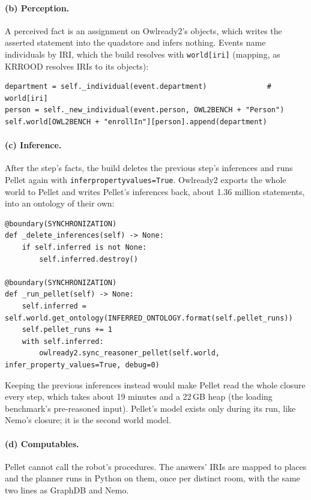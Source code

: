 \documentclass[10pt]{article}
\newcommand{\brkunderscore}{\textunderscore\allowbreak}
\newcommand{\code}[1]{{\let\_\brkunderscore\texttt{#1}}}
\begin{document}
\paragraph{(b) Perception.} A perceived fact is an assignment on Owlready2's objects, which writes the asserted
statement into the quadstore and infers nothing. Events name individuals by IRI, which the build resolves with
\code{world[iri]} (mapping, as KRROOD resolves IRIs to its objects):
\begin{lstlisting}[style=py]
department = self._individual(event.department)              # world[iri]
person = self._new_individual(event.person, OWL2BENCH + "Person")
self.world[OWL2BENCH + "enrollIn"][person].append(department)
\end{lstlisting}

\paragraph{(c) Inference.} After the step's facts, the build deletes the previous step's inferences and runs Pellet
again with \code{infer\_property\_values=True}. Owlready2 exports the whole world to Pellet and writes Pellet's
inferences back, about 1.36 million statements, into an ontology of their own:
\begin{lstlisting}[style=py]
@boundary(SYNCHRONIZATION)
def _delete_inferences(self) -> None:
    if self.inferred is not None:
        self.inferred.destroy()

@boundary(SYNCHRONIZATION)
def _run_pellet(self) -> None:
    self.inferred = self.world.get_ontology(INFERRED_ONTOLOGY.format(self.pellet_runs))
    self.pellet_runs += 1
    with self.inferred:
        owlready2.sync_reasoner_pellet(self.world, infer_property_values=True, debug=0)
\end{lstlisting}
Keeping the previous inferences instead would make Pellet read the whole closure every step, which takes about
19 minutes and a 22\,GB heap (the loading benchmark's pre-reasoned input). Pellet's model exists only during its run,
like Nemo's closure; it is the second world model.

\paragraph{(d) Computables.} Pellet cannot call the robot's procedures. The answers' IRIs are mapped to places and the
planner runs in Python on them, once per distinct room, with the same two lines as GraphDB and Nemo.
\end{document}
